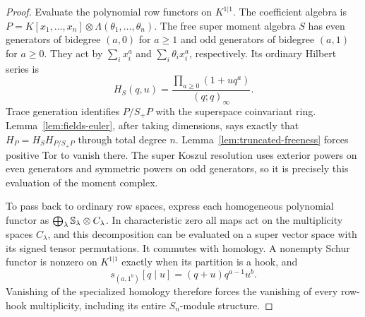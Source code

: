 \begin{proof}
Evaluate the polynomial row functors on $K^{1|1}$. The coefficient
algebra is
$P=K[x_1,\ldots,x_n]\otimes\Lambda(\theta_1,\ldots,\theta_n)$.
The free super moment algebra $S$ has even generators of
bidegree $(a,0)$ for $a\ge1$ and odd generators of bidegree
$(a,1)$ for $a\ge0$. They act by
$\sum_i x_i^a$ and $\sum_i\theta_i x_i^a$, respectively.
Its ordinary Hilbert series is
\[
 H_S(q,u)=\frac{\prod_{a\ge0}(1+uq^a)}{(q;q)_\infty}.
\]
Trace generation identifies $P/S_+P$ with the superspace
coinvariant ring. Lemma~\ref{lem:fields-euler}, after taking
dimensions, says exactly that
$H_P=H_SH_{P/S_+P}$ through total degree $n$.
Lemma~\ref{lem:truncated-freeness} forces positive Tor to vanish
there. The super Koszul resolution uses exterior powers on even
generators and symmetric powers on odd generators, so it is
precisely this evaluation of the moment complex.

To pass back to ordinary row spaces, express each homogeneous
polynomial functor as
$\bigoplus_\lambda\mathbb S_\lambda\otimes C_\lambda$.
In characteristic zero all maps act on the multiplicity spaces
$C_\lambda$, and this decomposition can be evaluated on a
super vector space with its signed tensor permutations.
It commutes with homology. A nonempty Schur functor is nonzero
on $K^{1|1}$ exactly when its partition is a hook, and
\[
 s_{(a,1^b)}[q\mid u]=(q+u)q^{a-1}u^b.
\]
Vanishing of the specialized homology therefore forces the
vanishing of every row-hook multiplicity, including its entire
$S_n$-module structure.
\end{proof}

